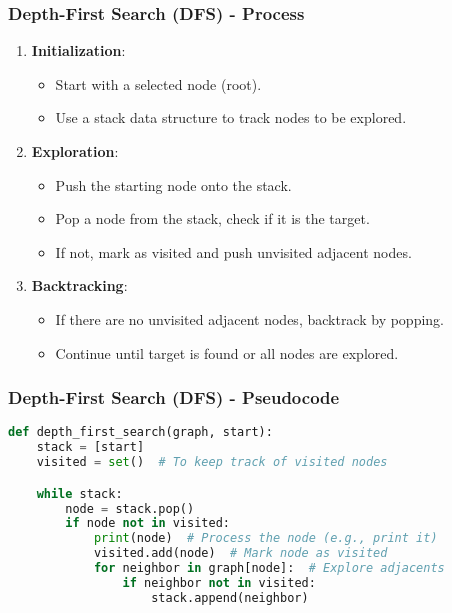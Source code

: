 \documentclass[aspectratio=169]{beamer}
\begin{document}
\begin{frame}[fragile]
    \frametitle{Depth-First Search (DFS) - Process}
    \begin{enumerate}
        \item \textbf{Initialization}:
            \begin{itemize}
                \item Start with a selected node (root).
                \item Use a stack data structure to track nodes to be explored.
            \end{itemize}
        \item \textbf{Exploration}:
            \begin{itemize}
                \item Push the starting node onto the stack.
                \item Pop a node from the stack, check if it is the target.
                \item If not, mark as visited and push unvisited adjacent nodes.
            \end{itemize}
        \item \textbf{Backtracking}:
            \begin{itemize}
                \item If there are no unvisited adjacent nodes, backtrack by popping.
                \item Continue until target is found or all nodes are explored.
            \end{itemize}
    \end{enumerate}
\end{frame}

\begin{frame}[fragile]
    \frametitle{Depth-First Search (DFS) - Pseudocode}
    \begin{lstlisting}[language=Python]
def depth_first_search(graph, start):
    stack = [start]
    visited = set()  # To keep track of visited nodes

    while stack:
        node = stack.pop()
        if node not in visited:
            print(node)  # Process the node (e.g., print it)
            visited.add(node)  # Mark node as visited
            for neighbor in graph[node]:  # Explore adjacents
                if neighbor not in visited:
                    stack.append(neighbor)
    \end{lstlisting}
\end{frame}
\end{document}
